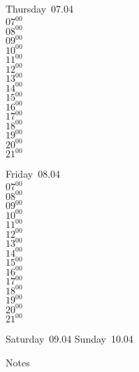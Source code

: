 \documentclass[11pt,a4paper]{book}\usepackage[]{graphicx}\usepackage[]{color}
\begin{document}
\clearpage
\begin{headerbox}
\end{headerbox}
\begin{weekdaybox}
  Thursday~07.04\\
  { 
  \vfill
  $07^{00}$\\
$08^{00}$\\
$09^{00}$\\
$10^{00}$\\
$11^{00}$\\
$12^{00}$\\
$13^{00}$\\
$14^{00}$\\
$15^{00}$\\
$16^{00}$\\
$17^{00}$\\
$18^{00}$\\
$19^{00}$\\
$20^{00}$\\
$21^{00}$\\
  }
\end{weekdaybox} 
\begin{weekdaybox}
  Friday~08.04\\
  { 
  \vfill
  $07^{00}$\\
$08^{00}$\\
$09^{00}$\\
$10^{00}$\\
$11^{00}$\\
$12^{00}$\\
$13^{00}$\\
$14^{00}$\\
$15^{00}$\\
$16^{00}$\\
$17^{00}$\\
$18^{00}$\\
$19^{00}$\\
$20^{00}$\\
$21^{00}$\\
  }
\end{weekdaybox}
\begin{weekendbox}
  Saturday~09.04
  \tcblower
  Sunday~10.04
\end{weekendbox} %
\begin{notebox}
  Notes
\end{notebox}
\clearpage
\end{document}
